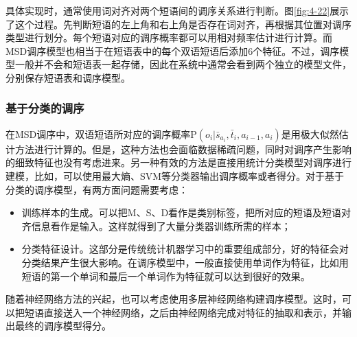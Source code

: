 \parinterval 具体实现时，通常使用词对齐对两个短语间的调序关系进行判断。图\ref{fig:4-22}展示了这个过程。先判断短语的左上角和右上角是否存在词对齐，再根据其位置对调序类型进行划分。每个短语对应的调序概率都可以用相对频率估计进行计算。而MSD调序模型也相当于在短语表中的每个双语短语后添加6个特征。不过，调序模型一般并不会和短语表一起存储，因此在系统中通常会看到两个独立的模型文件，分别保存短语表和调序模型。


\subsubsection{基于分类的调序}

\parinterval 在MSD调序中，双语短语所对应的调序概率$\textrm{P}(o_i| \bar{s}_{a_i}, \bar{t}_i, a_{i-1}, a_i)$是用极大似然估计方法进行计算的。但是，这种方法也会面临数据稀疏问题，同时对调序产生影响的细致特征也没有考虑进来。另一种有效的方法是直接用统计分类模型对调序进行建模，比如，可以使用最大熵、SVM等分类器输出调序概率或者得分\cite{xiong2006maximum,DBLP:journals/coling/OchN04,DBLP:conf/naacl/KumarB05}。对于基于分类的调序模型，有两方面问题需要考虑：

\begin{itemize}
\vspace{0.5em}
\item 训练样本的生成。可以把M、S、D看作是类别标签，把所对应的短语及短语对齐信息看作是输入。这样就得到了大量分类器训练所需的样本；
\vspace{0.5em}
\item 分类特征设计。这部分是传统统计机器学习中的重要组成部分，好的特征会对分类结果产生很大影响。在调序模型中，一般直接使用单词作为特征，比如用短语的第一个单词和最后一个单词作为特征就可以达到很好的效果。
\vspace{0.5em}
\end{itemize}

\parinterval 随着神经网络方法的兴起，也可以考虑使用多层神经网络构建调序模型\cite{li-etal-2014-neural}。这时，可以把短语直接送入一个神经网络，之后由神经网络完成对特征的抽取和表示，并输出最终的调序模型得分。


